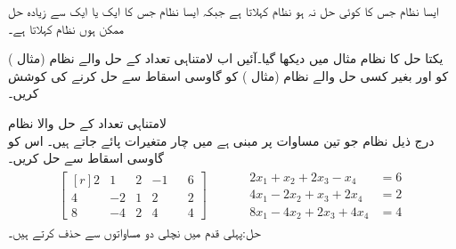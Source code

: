 ایسا نظام جس کا کوئی حل نہ ہو  نظام کہلاتا ہے جبکہ ایسا نظام جس کا ایک یا ایک سے زیادہ حل ممکن ہوں  نظام کہلاتا ہے۔

یکتا حل کا نظام مثال  میں دیکھا گیا۔آئیں اب لامتناہی تعداد کے حل والے نظام (مثال ) کو اور بغیر کسی حل والے نظام (مثال ) کو گاوسی اسقاط سے حل کرنے کی کوشش کریں۔   

\quad لامتناہی تعداد کے حل والا نظام\\
درج ذیل نظام جو تین مساوات پر مبنی ہے میں چار متغیرات پائے جاتے ہیں۔ اس کو گاوسی اسقاط سے حل کریں۔
\begin{gather*}
\begin{bmatrix*}[r]2&1&2&-1&&6\\4&-2&1&2&&2\\8&-4&2&4&&4  \end{bmatrix*}\quad\quad \quad
\begin{aligned}
2x_1+x_2+2x_3-x_4&=6\\
4x_1-2x_2+x_3+2x_4&=2\\
8x_1-4x_2+2x_3+4x_4&=4
\end{aligned}
\end{gather*}
حل:پہلی قدم میں نچلی دو مساواتوں سے  حذف کرتے ہیں۔

